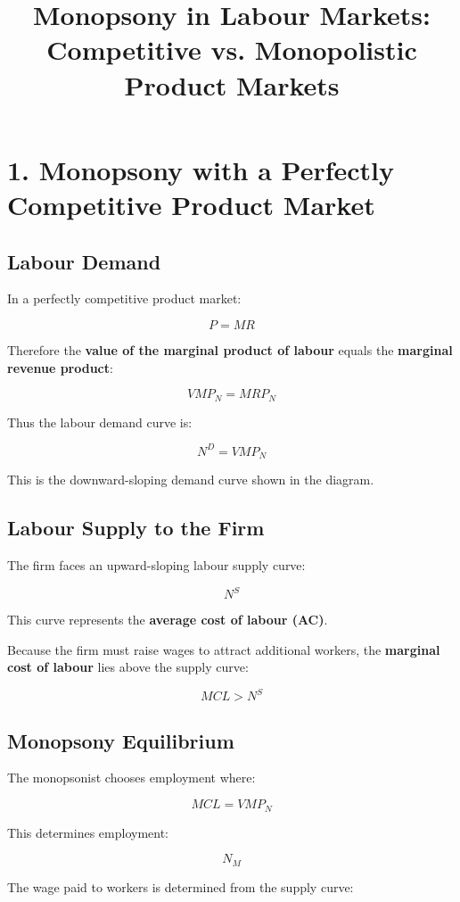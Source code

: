 \documentclass[12pt]{article}
\title{Monopsony in Labour Markets: Competitive vs. Monopolistic Product Markets}
\date{}
\begin{document}
\maketitle

\section*{1. Monopsony with a Perfectly Competitive Product Market}

\subsection*{Labour Demand}

In a perfectly competitive product market:

\[
P = MR
\]

Therefore the \textbf{value of the marginal product of labour} equals the \textbf{marginal revenue product}:

\[
VMP_N = MRP_N
\]

Thus the labour demand curve is:

\[
N^D = VMP_N
\]

This is the downward-sloping demand curve shown in the diagram.

\subsection*{Labour Supply to the Firm}

The firm faces an upward-sloping labour supply curve:

\[
N^S
\]

This curve represents the \textbf{average cost of labour (AC)}.

Because the firm must raise wages to attract additional workers, the \textbf{marginal cost of labour} lies above the supply curve:

\[
MCL > N^S
\]

\subsection*{Monopsony Equilibrium}

The monopsonist chooses employment where:

\[
MCL = VMP_N
\]

This determines employment:

\[
N_M
\]

The wage paid to workers is determined from the supply curve:
\end{document}
